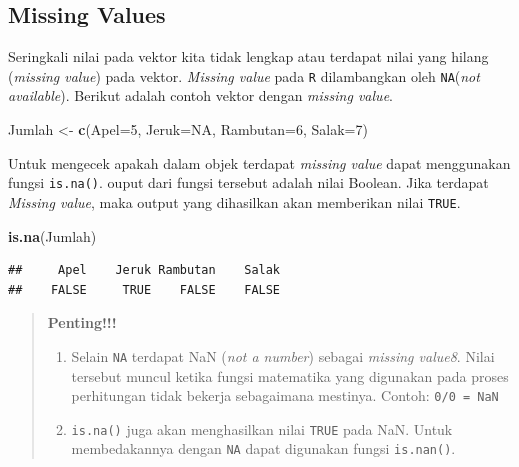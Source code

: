 \documentclass[
]{book}
\newenvironment{Shaded}{\begin{snugshade}}{\end{snugshade}}
\newcommand{\AttributeTok}[1]{\textcolor[rgb]{0.13,0.29,0.53}{#1}}
\newcommand{\ConstantTok}[1]{\textcolor[rgb]{0.56,0.35,0.01}{#1}}
\newcommand{\DecValTok}[1]{\textcolor[rgb]{0.00,0.00,0.81}{#1}}
\newcommand{\FunctionTok}[1]{\textcolor[rgb]{0.13,0.29,0.53}{\textbf{#1}}}
\newcommand{\NormalTok}[1]{#1}
\newcommand{\OtherTok}[1]{\textcolor[rgb]{0.56,0.35,0.01}{#1}}
\providecommand{\tightlist}{%
  \setlength{\itemsep}{0pt}\setlength{\parskip}{0pt}}
\theoremstyle{definition}
\theoremstyle{definition}
\theoremstyle{definition}
\theoremstyle{definition}
\theoremstyle{remark}
\begin{document}
\hypertarget{missingvalue}{%
\subsection{Missing Values}\label{missingvalue}}

Seringkali nilai pada vektor kita tidak lengkap atau terdapat nilai yang hilang (\emph{missing value}) pada vektor. \emph{Missing value} pada \texttt{R} dilambangkan oleh \texttt{NA}(\emph{not available}). Berikut adalah contoh vektor dengan \emph{missing value}.

\begin{Shaded}
\begin{Highlighting}[]
\NormalTok{Jumlah }\OtherTok{\textless{}{-}} \FunctionTok{c}\NormalTok{(}\AttributeTok{Apel=}\DecValTok{5}\NormalTok{, }\AttributeTok{Jeruk=}\ConstantTok{NA}\NormalTok{, }\AttributeTok{Rambutan=}\DecValTok{6}\NormalTok{, }\AttributeTok{Salak=}\DecValTok{7}\NormalTok{)}
\end{Highlighting}
\end{Shaded}

Untuk mengecek apakah dalam objek terdapat \emph{missing value} dapat menggunakan fungsi \texttt{is.na()}. ouput dari fungsi tersebut adalah nilai Boolean. Jika terdapat \emph{Missing value}, maka output yang dihasilkan akan memberikan nilai \texttt{TRUE}.

\begin{Shaded}
\begin{Highlighting}[]
\FunctionTok{is.na}\NormalTok{(Jumlah)}
\end{Highlighting}
\end{Shaded}

\begin{verbatim}
##     Apel    Jeruk Rambutan    Salak 
##    FALSE     TRUE    FALSE    FALSE
\end{verbatim}

\begin{quote}
\textbf{Penting!!!}

\begin{enumerate}
\def\labelenumi{\arabic{enumi}.}
\tightlist
\item
  Selain \texttt{NA} terdapat NaN (\emph{not a number}) sebagai \emph{missing value8}. Nilai tersebut muncul ketika fungsi matematika yang digunakan pada proses perhitungan tidak bekerja sebagaimana mestinya. Contoh: \texttt{0/0\ =\ NaN}
\item
  \texttt{is.na()} juga akan menghasilkan nilai \texttt{TRUE} pada NaN. Untuk membedakannya dengan \texttt{NA} dapat digunakan fungsi \texttt{is.nan()}.
\end{enumerate}
\end{quote}
\end{document}
